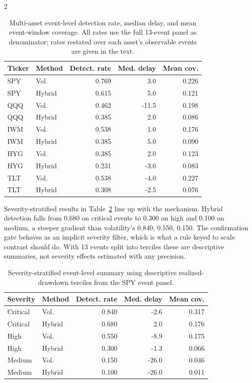 \documentclass{book}
\begin{document}
\begin{multicols}{2}
\begin{table}[H]
\centering
\caption{Multi-asset event-level detection rate, median delay, and mean event-window coverage. All rates use the full 13-event panel as denominator; rates restated over each asset's observable events are given in the text.}
\label{tab:multiasset_event_level}
\scriptsize
\begin{tabular}{llrrr}
\toprule
Ticker & Method & Detect. rate & Med. delay & Mean cov.\\
\midrule
SPY & Vol. & 0.769 & 3.0 & 0.226\\
SPY & Hybrid & 0.615 & 5.0 & 0.121\\
QQQ & Vol. & 0.462 & -11.5 & 0.198\\
QQQ & Hybrid & 0.385 & 2.0 & 0.086\\
IWM & Vol. & 0.538 & 1.0 & 0.176\\
IWM & Hybrid & 0.385 & 5.0 & 0.090\\
HYG & Vol. & 0.385 & 2.0 & 0.123\\
HYG & Hybrid & 0.231 & -3.0 & 0.083\\
TLT & Vol. & 0.538 & -4.0 & 0.227\\
TLT & Hybrid & 0.308 & -2.5 & 0.076\\
\bottomrule
\end{tabular}
\end{table}

Severity-stratified results in Table~\ref{tab:event_level_severity} line up with the mechanism. Hybrid detection falls from 0.680 on critical events to 0.300 on high and 0.100 on medium, a steeper gradient than volatility's 0.840, 0.550, 0.150. The confirmation gate behaves as an implicit severity filter, which is what a rule keyed to scale contrast should do. With 13 events split into terciles these are descriptive summaries, not severity effects estimated with any precision.

\begin{table}[H]
\centering
\caption{Severity-stratified event-level summary using descriptive realized-drawdown terciles from the SPY event panel.}
\label{tab:event_level_severity}
\scriptsize
\begin{tabular}{llrrr}
\toprule
Severity & Method & Detect. rate & Med. delay & Mean cov.\\
\midrule
Critical & Vol. & 0.840 & -2.6 & 0.317\\
Critical & Hybrid & 0.680 & 2.0 & 0.176\\
High & Vol. & 0.550 & -8.9 & 0.175\\
High & Hybrid & 0.300 & -1.3 & 0.066\\
Medium & Vol. & 0.150 & -26.0 & 0.046\\
Medium & Hybrid & 0.100 & -26.0 & 0.011\\
\bottomrule
\end{tabular}
\end{table}


\end{multicols}
\end{document}
